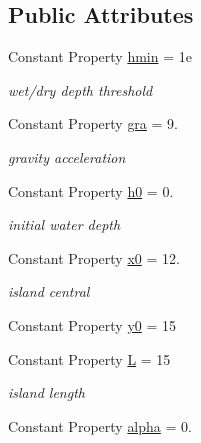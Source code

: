 \subsection*{Public Attributes}
\begin{DoxyCompactItemize}
\item 
Constant Property \hyperlink{class_conical_land_runup2d_a0beafeb47f116697e2d5aa984316acc9}{hmin} = 1e
\begin{DoxyCompactList}\small\item\em wet/dry depth threshold \end{DoxyCompactList}\item 
Constant Property \hyperlink{class_conical_land_runup2d_a694bfd9ca0b7caf8e5bd97e511a5ec43}{gra} = 9.
\begin{DoxyCompactList}\small\item\em gravity acceleration \end{DoxyCompactList}\item 
Constant Property \hyperlink{class_conical_land_runup2d_aa9bd353ff47465b73785aafcc8b20771}{h0} = 0.
\begin{DoxyCompactList}\small\item\em initial water depth \end{DoxyCompactList}\item 
Constant Property \hyperlink{class_conical_land_runup2d_ab13de10f73eb8fbabb397b213ab670a9}{x0} = 12.
\begin{DoxyCompactList}\small\item\em island central \end{DoxyCompactList}\item 
Constant Property \hyperlink{class_conical_land_runup2d_a88241a003707236fdb83136ed0d61d1d}{y0} = 15
\item 
Constant Property \hyperlink{class_conical_land_runup2d_a75afd4e6e5e03198868f9aaecc20c1db}{L} = 15
\begin{DoxyCompactList}\small\item\em island length \end{DoxyCompactList}\item 
Constant Property \hyperlink{class_conical_land_runup2d_a99836a8952ae4a6d9c950bb09244d3ef}{alpha} = 0.
\end{DoxyCompactItemize}
